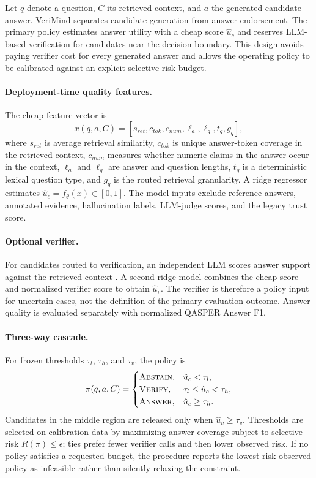 \documentclass[smallextended]{svjour3}
\begin{document}
Let $q$ denote a question, $C$ its retrieved context, and $a$ the generated candidate answer. VeriMind separates candidate generation from answer endorsement. The primary policy estimates answer utility with a cheap score $\hat{u}_{c}$ and reserves LLM-based verification for candidates near the decision boundary. This design avoids paying verifier cost for every generated answer and allows the operating policy to be calibrated against an explicit selective-risk budget.

\paragraph{Deployment-time quality features.}
The cheap feature vector is
\begin{equation}
x(q,a,C) = [s_{ret}, c_{tok}, c_{num}, \ell_a, \ell_q, t_q, g_q],
\label{eq:cheap_features}
\end{equation}
where $s_{ret}$ is average retrieval similarity, $c_{tok}$ is unique answer-token coverage in the retrieved context, $c_{num}$ measures whether numeric claims in the answer occur in the context, $\ell_a$ and $\ell_q$ are answer and question lengths, $t_q$ is a deterministic lexical question type, and $g_q$ is the routed retrieval granularity. A ridge regressor estimates $\hat{u}_{c}=f_{\theta}(x)\in[0,1]$. The model inputs exclude reference answers, annotated evidence, hallucination labels, LLM-judge scores, and the legacy trust score.

\paragraph{Optional verifier.}
For candidates routed to verification, an independent LLM scores answer support against the retrieved context \citep{zheng2023judging}. A second ridge model combines the cheap score and normalized verifier score to obtain $\hat{u}_{v}$. The verifier is therefore a policy input for uncertain cases, not the definition of the primary evaluation outcome. Answer quality is evaluated separately with normalized QASPER Answer F1.

\paragraph{Three-way cascade.}
For frozen thresholds $\tau_l$, $\tau_h$, and $\tau_v$, the policy is
\begin{equation}
\pi(q,a,C)=
\begin{cases}
\textsc{Abstain}, & \hat{u}_{c}<\tau_l,\\
\textsc{Verify}, & \tau_l\leq\hat{u}_{c}<\tau_h,\\
\textsc{Answer}, & \hat{u}_{c}\geq\tau_h.
\end{cases}
\label{eq:cascade_policy}
\end{equation}
Candidates in the middle region are released only when $\hat{u}_{v}\geq\tau_v$. Thresholds are selected on calibration data by maximizing answer coverage subject to selective risk $R(\pi)\leq\epsilon$; ties prefer fewer verifier calls and then lower observed risk. If no policy satisfies a requested budget, the procedure reports the lowest-risk observed policy as infeasible rather than silently relaxing the constraint.
\end{document}
